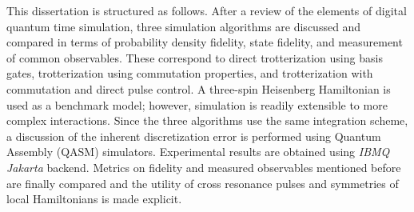 This dissertation is structured as follows. After a review of the elements of digital quantum time simulation, three simulation algorithms are discussed and compared in terms of probability density fidelity, state fidelity, and measurement of common observables. These correspond to direct trotterization using basis gates, trotterization using commutation properties, and trotterization with commutation and direct pulse control. A three-spin Heisenberg Hamiltonian is used as a benchmark model; however, simulation is readily extensible to more complex interactions. Since the three algorithms use the same integration scheme, a discussion of the inherent discretization error is performed using Quantum Assembly (QASM) simulators. Experimental results are obtained using \textit{IBMQ Jakarta} backend. Metrics on fidelity and measured observables mentioned before are finally compared and the utility of cross resonance pulses and symmetries of local Hamiltonians is made explicit.